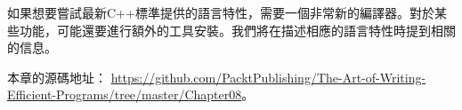 如果想要嘗試最新C++標準提供的語言特性，需要一個非常新的編譯器。對於某些功能，可能還要進行額外的工具安裝。我們將在描述相應的語言特性時提到相關的信息。

本章的源碼地址： \url{https://github.com/PacktPublishing/The-Art-of-Writing-Efficient-Programs/tree/master/Chapter08}。